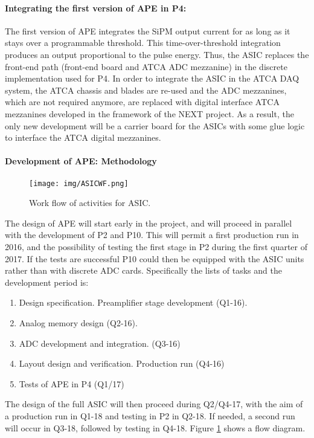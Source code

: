 \paragraph{Integrating the first version of APE in P4:}
The first version of APE integrates the SiPM output current for as long as it stays over a programmable threshold. This time-over-threshold integration produces an output proportional to the pulse energy. 
Thus, the ASIC replaces the front-end path (front-end board and ATCA ADC mezzanine) in the discrete implementation used for P4. In order to integrate the ASIC in the ATCA DAQ system, the ATCA chassis and blades are re-used and the ADC mezzanines, which are not required anymore, are replaced with digital interface ATCA mezzanines developed in the framework of the NEXT project. As a result, the only new development will be a carrier board for the ASICs with some glue logic to interface the ATCA digital mezzanines.
 
 \paragraph{Development of APE: Methodology}
 
 \begin{figure}[!htb]
	\centering
	\texttt{[image: img/ASICWF.png]}
	\caption{\label{fig.ASICWF} Work flow of activities for ASIC.  }
\end{figure}

 
The design of APE will start early in the project, and will proceed in parallel with the development of P2 and P10. This will permit a first production run in 2016, and the possibility of testing the first stage in P2 during the first quarter of 2017. If the tests are successful P10 could then be equipped with the ASIC units rather than with discrete ADC cards. Specifically the lists of tasks and the development period is:

\begin{enumerate}
\item Design specification. Preamplifier stage development (Q1-16).
\item Analog memory design (Q2-16).
\item ADC development and integration. (Q3-16)
\item Layout design and verification. Production run (Q4-16)
\item Tests of APE in P4 (Q1/17)
\end{enumerate}
 
 The design of the full ASIC will then proceed during Q2/Q4-17, with the aim of a production run in Q1-18 and testing in P2 in Q2-18. If needed, a second run will occur in Q3-18, followed by testing in Q4-18. Figure \ref{fig.ASICWF} shows a flow diagram. 
